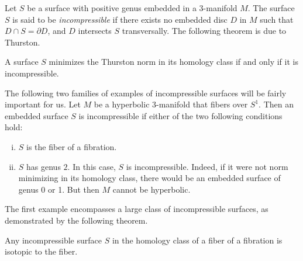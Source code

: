Let $S$ be a surface with positive genus embedded in a $3$-manifold $M$.  The surface $S$ is said to be {\it incompressible} if there
  exists no embedded disc $D$ in $M$ such that $D \cap S = \partial D$, and $D$ intersects $S$ transversally.  The following theorem is due to Thurston.
\begin{thm}
  A surface $S$ minimizes the Thurston norm in its homology class if and only if it is incompressible.
\end{thm}

 The following two families of examples of incompressible surfaces will be fairly important for us.
  Let $M$ be a hyperbolic $3$-manifold that fibers over $S^1$. Then an embedded surface $S$ is incompressible
  if either of the two following conditions hold:
  \begin{enumerate}[(i)]
  \item $S$ is the fiber of a fibration.
  \item $S$ has genus $2$. In this case, $S$ is incompressible.  Indeed, if it were not norm minimizing in its homology
    class, there would be an embedded surface of genus 0 or 1. But then $M$ cannot be hyperbolic.
  \end{enumerate}

The first example encompasses a large class of incompressible surfaces, as demonstrated by the following theorem.
\begin{thm}
  \label{thm:ThurIsotope}
  Any incompressible surface $S$ in the homology class of a fiber of a fibration is isotopic to the fiber.
\end{thm}

